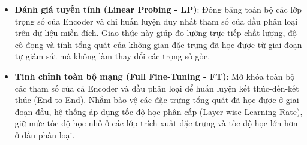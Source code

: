 \begin{itemize}
    \item \textbf{Đánh giá tuyến tính (Linear Probing - LP)}: Đóng băng toàn bộ các lớp trọng số của Encoder và chỉ huấn luyện duy nhất tham số của đầu phân loại trên dữ liệu miền đích. Giao thức này giúp đo lường trực tiếp chất lượng, độ cô đọng và tính tổng quát của không gian đặc trưng đã học được từ giai đoạn tự giám sát mà không làm thay đổi các trọng số gốc.
    \item \textbf{Tinh chỉnh toàn bộ mạng (Full Fine-Tuning - FT)}: Mở khóa toàn bộ các tham số của cả Encoder và đầu phân loại để huấn luyện kết thúc-đến-kết thúc (End-to-End). Nhằm bảo vệ các đặc trưng tổng quát đã học được ở giai đoạn đầu, hệ thống áp dụng tốc độ học phân cấp (Layer-wise Learning Rate), giữ mức tốc độ học nhỏ ở các lớp trích xuất đặc trưng và tốc độ học lớn hơn ở đầu phân loại.
\end{itemize}
